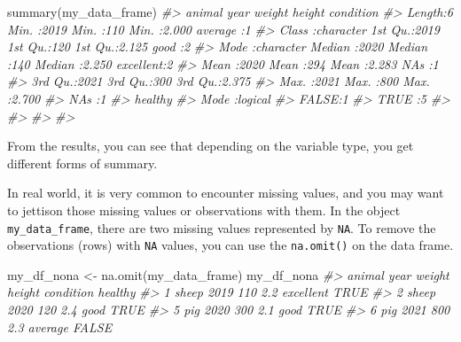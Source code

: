 \documentclass[
]{book}
\newenvironment{Shaded}{\begin{snugshade}}{\end{snugshade}}
\newcommand{\CommentTok}[1]{\textcolor[rgb]{0.56,0.35,0.01}{\textit{#1}}}
\newcommand{\FunctionTok}[1]{\textcolor[rgb]{0.00,0.00,0.00}{#1}}
\newcommand{\NormalTok}[1]{#1}
\newcommand{\OtherTok}[1]{\textcolor[rgb]{0.56,0.35,0.01}{#1}}
\begin{document}
\begin{Shaded}
\begin{Highlighting}[]
\FunctionTok{summary}\NormalTok{(my\_data\_frame)}
\CommentTok{\#\textgreater{}     animal               year          weight        height          condition}
\CommentTok{\#\textgreater{}  Length:6           Min.   :2019   Min.   :110   Min.   :2.000   average  :1  }
\CommentTok{\#\textgreater{}  Class :character   1st Qu.:2019   1st Qu.:120   1st Qu.:2.125   good     :2  }
\CommentTok{\#\textgreater{}  Mode  :character   Median :2020   Median :140   Median :2.250   excellent:2  }
\CommentTok{\#\textgreater{}                     Mean   :2020   Mean   :294   Mean   :2.283   NA\textquotesingle{}s     :1  }
\CommentTok{\#\textgreater{}                     3rd Qu.:2021   3rd Qu.:300   3rd Qu.:2.375                }
\CommentTok{\#\textgreater{}                     Max.   :2021   Max.   :800   Max.   :2.700                }
\CommentTok{\#\textgreater{}                                    NA\textquotesingle{}s   :1                                  }
\CommentTok{\#\textgreater{}   healthy       }
\CommentTok{\#\textgreater{}  Mode :logical  }
\CommentTok{\#\textgreater{}  FALSE:1        }
\CommentTok{\#\textgreater{}  TRUE :5        }
\CommentTok{\#\textgreater{}                 }
\CommentTok{\#\textgreater{}                 }
\CommentTok{\#\textgreater{}                 }
\CommentTok{\#\textgreater{} }
\end{Highlighting}
\end{Shaded}

From the results, you can see that depending on the variable type, you get different forms of summary.

In real world, it is very common to encounter missing values, and you may want to jettison those missing values or observations with them. In the object \texttt{my\_data\_frame}, there are two missing values represented by \texttt{NA}. To remove the observations (rows) with \texttt{NA} values, you can use the \texttt{na.omit()} on the data frame.

\begin{Shaded}
\begin{Highlighting}[]
\NormalTok{my\_df\_nona }\OtherTok{\textless{}{-}} \FunctionTok{na.omit}\NormalTok{(my\_data\_frame)}
\NormalTok{my\_df\_nona}
\CommentTok{\#\textgreater{}   animal year weight height condition healthy}
\CommentTok{\#\textgreater{} 1  sheep 2019    110    2.2 excellent    TRUE}
\CommentTok{\#\textgreater{} 2  sheep 2020    120    2.4      good    TRUE}
\CommentTok{\#\textgreater{} 5    pig 2020    300    2.1      good    TRUE}
\CommentTok{\#\textgreater{} 6    pig 2021    800    2.3   average   FALSE}
\end{Highlighting}
\end{Shaded}
\end{document}
